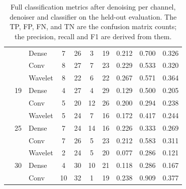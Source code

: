 \documentclass[ %
                    author={Rzan Alkabier},
                    supervisor={Dr. Zahraa Abdallah},
                    degree={MSc},
                     title={Denoising Extracellular Recording for Spike Detection and Classification on Single Channels},
                    subtitle={Does denoising improve detection and classification performance?},
                      type={},
                      year={2026}]{dissertation}
\begin{document}
\begin{table}[htbp]
\begin{tabular}{lllccccccc}
     & & Dense   & 7 & 26 & 3 & 19 & 0.212 & 0.700 & 0.326 \\
     & & Conv & 8 & 27 & 7 & 23 & 0.229 & 0.533 & 0.320 \\
    \cmidrule{2-10}
     & \multirow{3}{*}{19} & Wavelet & 8  & 22 & 6  & 22 & 0.267 & 0.571 & 0.364 \\
     & & Dense & 4 & 27 & 4 & 29 & 0.129 & 0.500 & 0.205 \\
     & & Conv & 5 & 20 & 12 & 26 & 0.200 & 0.294 & 0.238 \\
    \cmidrule{2-10}
     & \multirow{3}{*}{25} & Wavelet & 5 & 24 & 7 & 16 & 0.172 & 0.417 & 0.244 \\
     & & Dense & 7 & 24 & 14 & 16 & 0.226 & 0.333 & 0.269 \\
     & & Conv & 7 & 26 & 5 & 23 & 0.212 & 0.583 & 0.311 \\
    \cmidrule{2-10}
     & \multirow{3}{*}{30} & Wavelet & 2  & 24 & 5  & 20 & 0.077 & 0.286 & 0.121 \\
     & & Dense & 4 & 30 & 10 & 21 & 0.118 & 0.286 & 0.167 \\
     & & Conv & 10 & 32 & 1 & 19 & 0.238 & 0.909 & 0.377 \\
    \bottomrule
    \end{tabular}
    \caption{Full classification metrics after denoising per channel, denoiser and classifier on the held-out evaluation. The TP, FP, FN, and TN are the confusion matrix counts; the precision, recall and F1 are derived from them.}
    \label{tab:confusion matrix classification after denoising}
\end{table}



\end{document}
